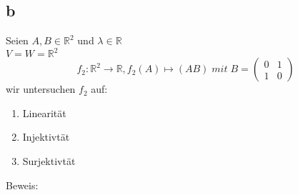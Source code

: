 \documentclass[10pt,a4paper]{article}
\begin{document}
\subsection{b}
Seien $ A,B \in \mathbb{R}^2$ und $ \lambda \in \mathbb{R}$ \\$V=W=\mathbb{R}^2$ \\ 
$$ f_{2}:\mathbb{R}^2 \rightarrow \mathbb{R}, f_{2}(A)\mapsto (AB) \; mit \; B=
\begin{pmatrix} 
0 & 1 \\
1 & 0 
\end{pmatrix} 
$$ 
wir untersuchen $f_{2}$ auf:\\
\begin{enumerate}
\item Linearität
\item Injektivtät
\item Surjektivtät
\end{enumerate}
Beweis:
\end{document}
